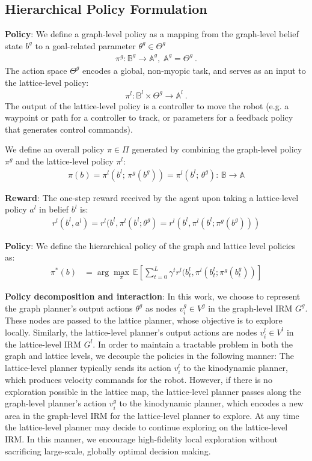 \documentclass{article}
\newcommand{\ph}[1]{{\textbf{#1}:}} %
\begin{document}
\subsection{Hierarchical Policy Formulation}
\label{sec:hierarchical_policy}
\ph{Policy} We define a graph-level policy as a mapping from the graph-level belief state $b^g$ to a goal-related parameter $\theta^g \in \Theta^g$ 
\begin{align}
    \pi^g : \mathbb{B}^g \to \mathbb{A}^g, \; \mathbb{A}^g = \Theta^g\ .
\end{align}
The action space $\Theta^g$ encodes a global, non-myopic task, and serves as an input to the lattice-level policy: 
\begin{align}
    \pi^l: \mathbb{B}^l \times \Theta^g \to \mathbb{A}^l\ .
\end{align}
The output of the lattice-level policy is a controller to move the robot (e.g. a waypoint or path for a controller to track, or parameters for a feedback policy that generates control commands).

We define an overall policy $\pi \in \Pi$ generated by combining the graph-level policy $\pi^g$ and the lattice-level policy $\pi^l$:
\begin{align}
    \pi(b) = \pi^l(b^l; \, \pi^g(b^g)) = \pi^l(b^l; \, \theta^g) : \, \mathbb{B}\rightarrow \mathbb{A} 
\end{align}

\ph{Reward} The one-step reward received by the agent upon taking a lattice-level policy $a^l$ in belief $b^l$ is:
\begin{align}
    r^l(b^l, a^l) = r^l(b^l, \pi^l(b^l; \theta^g) = r^l(b^l, \pi^l(b^l; \pi^g(b^g)))
\end{align}

\ph{Policy} We define the hierarchical policy of the graph and lattice level policies as:
\begin{align}
  \pi^{*}(b) &= \arg\max_\pi \, \mathbb{E} \left[ \sum_{t=0}^{L} \gamma^t r^l(b^l_t, \pi^l(b^l_t; \pi^g(b^g_t)) \right]
  \label{eq:optimal_policy_unified}
\end{align}

\ph{Policy decomposition and interaction} In this work, we choose to represent the graph planner's output actions $\theta^g$ as nodes $v^g_i \in V^g$ in the graph-level IRM $G^g$. These nodes are passed to the lattice planner, whose objective is to explore locally. Similarly, the lattice-level planner's output actions are nodes $v^l_i \in V^l$ in the lattice-level IRM $G^l$.  In order to maintain a tractable problem in both the graph and lattice levels, we decouple the policies in the following manner:  The lattice-level planner typically sends its action $v^l_i$ to the kinodynamic planner, which produces velocity commands for the robot.  However, if there is no exploration possible in the lattice map, the lattice-level planner passes along the graph-level planner's action $v^g_i$ to the kinodynamic planner, which encodes a new area in the graph-level IRM for the lattice-level planner to explore.  At any time the lattice-level planner may decide to continue exploring on the lattice-level IRM.  In this manner, we encourage high-fidelity local exploration without sacrificing large-scale, globally optimal decision making.
\end{document}
